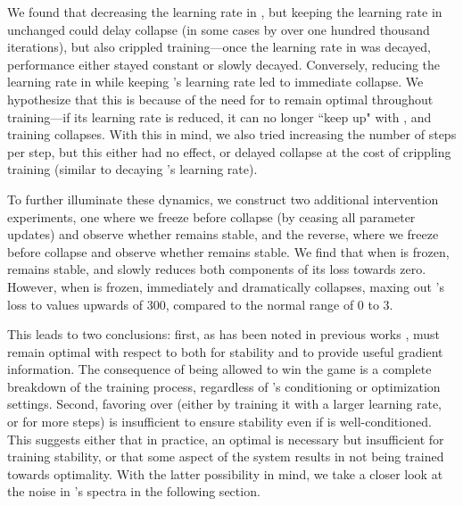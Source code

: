 We found that decreasing the learning rate in \gen{}, but keeping the learning rate in \discr{} unchanged could delay collapse (in some cases by over one hundred thousand iterations), but also crippled training---once the learning rate in \gen{} was decayed, performance either stayed constant or slowly decayed. Conversely, reducing the learning rate in \discr{} while keeping \gen{}'s learning rate led to immediate collapse. We hypothesize that this is because of the need for \discr{} to remain optimal throughout training---if its learning rate is reduced, it can no longer ``keep up" with \gen{}, and training collapses. With this in mind, we also tried increasing the number of \discr{} steps per \gen{} step, but this either had no effect, or delayed collapse at the cost of crippling training (similar to decaying \gen{}'s learning rate).




To further illuminate these dynamics, we construct two additional intervention experiments, one where we freeze \gen{} before collapse (by ceasing all parameter updates) and observe whether \discr{} remains stable, and the reverse, where we freeze \discr{} before collapse and observe whether \gen{} remains stable. We find that when \gen{} is frozen, \discr{} remains stable, and slowly reduces both components of its loss towards zero. However, when \discr{} is frozen, \gen{} immediately and dramatically collapses, maxing out \discr{}'s loss to values upwards of 300, compared to the normal range of 0 to 3. 



This leads to two conclusions: first, as has been noted in previous works \citep{miyato2018spectral, gulrajani2017improved, zhang2018sagan}, \discr{} must remain optimal with respect to \gen{} both for stability and to provide useful gradient information. The consequence of \gen{} being allowed to win the game is a complete breakdown of the training process, regardless of \gen{}'s conditioning or optimization settings. Second, favoring \discr{} over \gen{} (either by training it with a larger learning rate, or for more steps) is insufficient to ensure stability even if \discr{} is well-conditioned. This suggests either that in practice, an optimal \discr{} is necessary but insufficient for training stability, or that some aspect of the system results in \discr{} not being trained towards optimality. With the latter possibility in mind, we take a closer look at the noise in \discr{}'s spectra in the following section.

